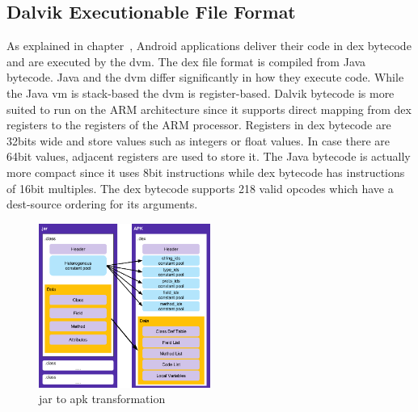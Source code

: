 \subsection{Dalvik Executionable File Format} \label{subsection:android-dex}
As explained in chapter~\cite{subsection:foundation-android-package}, Android applications deliver their code in \gls{dex} bytecode and are executed by the \gls{dvm}.
The dex file format is compiled from Java bytecode.
Java and the \gls{dvm} differ significantly in how they execute code.
While the Java \gls{vm} is stack-based the \gls{dvm} is register-based.
Dalvik bytecode is more suited to run on the ARM architecture since it supports direct mapping from dex registers to the registers of the ARM processor.
Registers in \gls{dex} bytecode are 32bits wide and store values such as integers or float values.
In case there are 64bit values, adjacent registers are used to store it.
The Java bytecode is actually more compact since it uses 8bit instructions while \gls{dex} bytecode has instructions of 16bit multiples.
The \gls{dex} bytecode supports 218 valid opcodes which have a dest-source ordering for its arguments.
\newline
\begin{figure}[h]
    \centering
    \includegraphics[width=0.5\textwidth]{data/java.png}
    \caption{\gls{jar} to \gls{apk} transformation \cite{googleDalvik}}
    \label{fig:java}
\end{figure}

